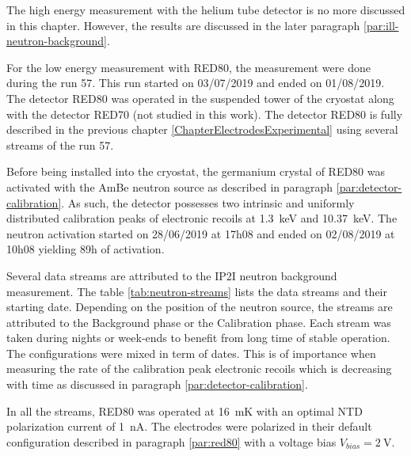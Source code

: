 The high energy measurement with the helium tube detector is no more discussed in this chapter. However, the results are discussed in the later paragraph \ref{par:ill-neutron-background}.

For the low energy measurement with RED80, the measurement were done during the run 57. This run started on 03/07/2019 and ended on 01/08/2019. The detector RED80 was operated in the suspended tower of the cryostat along with the detector RED70 (not studied in this work). The detector RED80 is fully described in the previous chapter \ref{ChapterElectrodesExperimental} using several streams of the run 57.

Before being installed into the cryostat, the germanium crystal of RED80 was activated with the AmBe neutron source as described in paragraph \ref{par:detector-calibration}. As such, the detector possesses two intrinsic and uniformly distributed calibration peaks of electronic recoils at \SI{1.3}{\kilo\eV} and \SI{10.37}{\kilo\eV}. The neutron activation started on 28/06/2019 at 17h08 and ended on 02/08/2019 at 10h08 yielding 89h of activation.

Several data streams are attributed to the IP2I neutron background measurement. The table \ref{tab:neutron-streams} lists the data streams and their starting date. Depending on the position of the neutron source, the streams are attributed to the Background phase or the Calibration phase.
Each stream was taken during nights or week-ends to benefit from long time of stable operation. The configurations were mixed in term of dates. This is of importance when measuring the rate of the calibration peak electronic recoils which is decreasing with time as discussed in paragraph \ref{par:detector-calibration}.

In all the streams, RED80 was operated at \SI{16}{\milli\kelvin} with an optimal NTD polarization current of \SI{1}{\nano\ampere}. The electrodes were polarized in their default configuration described in paragraph \ref{par:red80} with a voltage bias $V_{bias} = \SI{2}{\volt}$.

